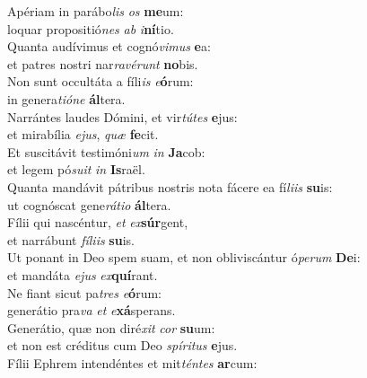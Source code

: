 \evenverse Apériam in parábo\textit{lis} \textit{os} \textbf{me}um:~\*\\
\evenverse loquar propositió\textit{nes} \textit{ab} \textit{i}\textbf{ní}tio.\\
\oddverse Quanta audívimus et cognó\textit{vi}\textit{mus} \textbf{e}a:~\*\\
\oddverse et patres nostri nar\textit{ra}\textit{vé}\textit{runt} \textbf{no}bis.\\
\evenverse Non sunt occultáta a fíli\textit{is} \textit{e}\textbf{ó}rum:~\*\\
\evenverse in genera\textit{ti}\textit{ó}\textit{ne} \textbf{ál}tera.\\
\oddverse Narrántes laudes Dómini, et vir\textit{tú}\textit{tes} \textbf{e}jus:~\*\\
\oddverse et mirabília \textit{e}\textit{jus}, \textit{quæ} \textbf{fe}cit.\\
\evenverse Et suscitávit testimóni\textit{um} \textit{in} \textbf{Ja}cob:~\*\\
\evenverse et legem pó\textit{su}\textit{it} \textit{in} \textbf{Is}raël.\\
\oddverse Quanta mandávit pátribus nostris nota fácere ea fí\textit{li}\textit{is} \textbf{su}is:~\*\\
\oddverse ut cognóscat gene\textit{rá}\textit{ti}\textit{o} \textbf{ál}tera.\\
\evenverse Fílii qui nascéntur, \textit{et} \textit{ex}\textbf{súr}gent,~\*\\
\evenverse et narrábunt \textit{fí}\textit{li}\textit{is} \textbf{su}is.\\
\oddverse Ut ponant in Deo spem suam, et non obliviscántur ó\textit{pe}\textit{rum} \textbf{De}i:~\*\\
\oddverse et mandáta \textit{e}\textit{jus} \textit{ex}\textbf{quí}rant.\\
\evenverse Ne fiant sicut pa\textit{tres} \textit{e}\textbf{ó}rum:~\*\\
\evenverse generátio pra\textit{va} \textit{et} \textit{e}\textbf{xá}sperans.\\
\oddverse Generátio, quæ non diré\textit{xit} \textit{cor} \textbf{su}um:~\*\\
\oddverse et non est créditus cum Deo \textit{spí}\textit{ri}\textit{tus} \textbf{e}jus.\\
\evenverse Fílii Ephrem intendéntes et mit\textit{tén}\textit{tes} \textbf{ar}cum:~\*\\
